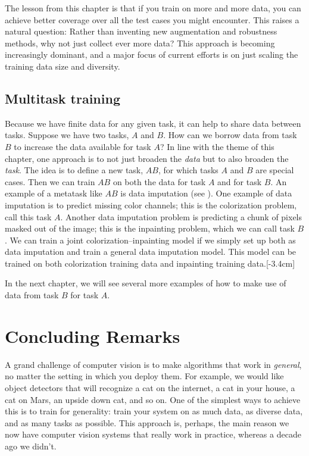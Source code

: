 The lesson from this chapter is that if you train on more and more data, you can achieve better coverage over all the test cases you might encounter. This raises a natural question: Rather than inventing new augmentation and robustness methods, why not just collect ever more data? This approach is becoming increasingly dominant, and a major focus of current efforts is on just scaling the training data size and diversity. 

\subsection{Multitask training}
Because we have finite data for any given task, it can help to share data between tasks. Suppose we have two tasks, $A$ and $B$. How can we borrow data from task $B$ to increase the data available for task $A$? In line with the theme of this chapter, one approach is to not just broaden the \textit{data} but to also broaden the \textit{task}. The idea is to define a new task, $AB$, for which tasks $A$ and $B$ are special cases. Then we can train $AB$ on both the data for task $A$ and for task $B$. An example of a metatask like $AB$ is data imputation (see \chap{\ref{chapter:generative_modeling_and_representation_learning}}). One example of data imputation is to predict missing color channels; this is the colorization problem, call this task $A$. Another data imputation problem is predicting a chunk of pixels masked out of the image; this is the inpainting problem, which we can call task $B$. We can train a joint colorization–inpainting model if we simply set up both as data imputation and train a general data imputation model. This model can be trained on both colorization training data and inpainting training data.[-3.4cm]

In the next chapter, we will see several more examples of how to make use of data from task $B$ for task $A$.


\section{Concluding Remarks}

A grand challenge of computer vision is to make algorithms that work in \textit{general}, no matter the setting in which you deploy them. For example, we would like object detectors that will recognize a cat on the internet, a cat in your house, a cat on Mars, an upside down cat, and so on. One of the simplest ways to achieve this is to train for generality: train your system on as much data, as diverse data, and as many tasks as possible. This approach is, perhaps, the main reason we now have computer vision systems that really work in practice, whereas a decade ago we didn't.

